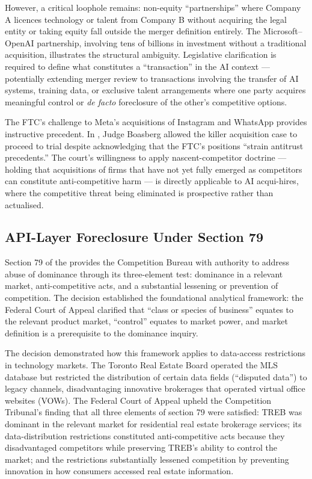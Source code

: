 However, a critical loophole remains: non-equity ``partnerships'' where Company A licences technology or talent from Company B without acquiring the legal entity or taking equity fall outside the merger definition entirely. The Microsoft--OpenAI partnership, involving tens of billions in investment without a traditional acquisition, illustrates the structural ambiguity. Legislative clarification is required to define what constitutes a ``transaction'' in the AI context --- potentially extending merger review to transactions involving the transfer of AI systems, training data, or exclusive talent arrangements where one party acquires meaningful control or \textit{de facto} foreclosure of the other's competitive options.

The FTC's challenge to Meta's acquisitions of Instagram and WhatsApp provides instructive precedent. In , Judge Boasberg allowed the killer acquisition case to proceed to trial despite acknowledging that the FTC's positions ``strain antitrust precedents.'' The court's willingness to apply nascent-competitor doctrine --- holding that acquisitions of firms that have not yet fully emerged as competitors can constitute anti-competitive harm --- is directly applicable to AI acqui-hires, where the competitive threat being eliminated is prospective rather than actualised.

\subsection{API-Layer Foreclosure Under Section 79}

Section 79 of the  provides the Competition Bureau with authority to address abuse of dominance through its three-element test: dominance in a relevant market, anti-competitive acts, and a substantial lessening or prevention of competition. The  decision established the foundational analytical framework: the Federal Court of Appeal clarified that ``class or species of business'' equates to the relevant product market, ``control'' equates to market power, and market definition is a prerequisite to the dominance inquiry.

The  decision demonstrated how this framework applies to data-access restrictions in technology markets. The Toronto Real Estate Board operated the MLS database but restricted the distribution of certain data fields (``disputed data'') to legacy channels, disadvantaging innovative brokerages that operated virtual office websites (VOWs). The Federal Court of Appeal upheld the Competition Tribunal's finding that all three elements of section 79 were satisfied: TREB was dominant in the relevant market for residential real estate brokerage services; its data-distribution restrictions constituted anti-competitive acts because they disadvantaged competitors while preserving TREB's ability to control the market; and the restrictions substantially lessened competition by preventing innovation in how consumers accessed real estate information.

